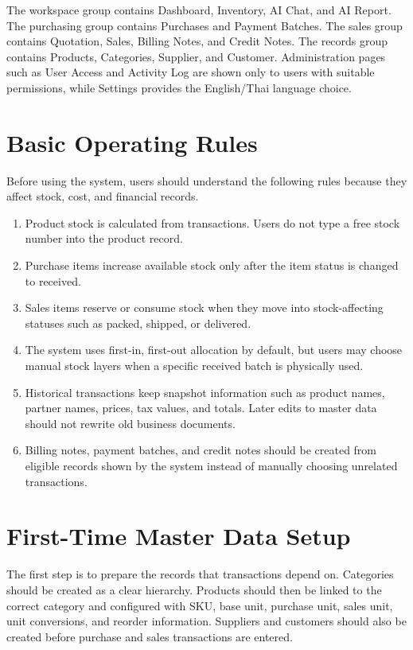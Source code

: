 The workspace group contains Dashboard, Inventory, AI Chat, and AI Report. The purchasing group contains Purchases and Payment Batches. The sales group contains Quotation, Sales, Billing Notes, and Credit Notes. The records group contains Products, Categories, Supplier, and Customer. Administration pages such as User Access and Activity Log are shown only to users with suitable permissions, while Settings provides the English/Thai language choice.

\section{Basic Operating Rules}

Before using the system, users should understand the following rules because they affect stock, cost, and financial records.

\begin{enumerate}
	\item Product stock is calculated from transactions. Users do not type a free stock number into the product record.
	\item Purchase items increase available stock only after the item status is changed to received.
	\item Sales items reserve or consume stock when they move into stock-affecting statuses such as packed, shipped, or delivered.
	\item The system uses first-in, first-out allocation by default, but users may choose manual stock layers when a specific received batch is physically used.
	\item Historical transactions keep snapshot information such as product names, partner names, prices, tax values, and totals. Later edits to master data should not rewrite old business documents.
	\item Billing notes, payment batches, and credit notes should be created from eligible records shown by the system instead of manually choosing unrelated transactions.
\end{enumerate}

\section{First-Time Master Data Setup}

The first step is to prepare the records that transactions depend on. Categories should be created as a clear hierarchy. Products should then be linked to the correct category and configured with SKU, base unit, purchase unit, sales unit, unit conversions, and reorder information. Suppliers and customers should also be created before purchase and sales transactions are entered.


